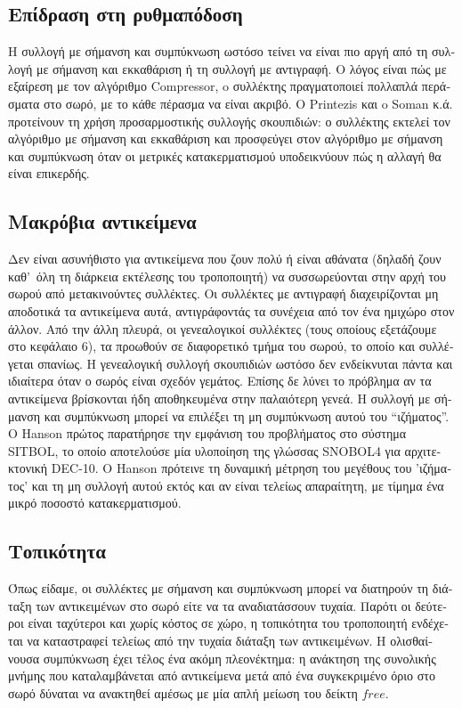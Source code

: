 \begin{greek}
\subsection{Επίδραση στη ρυθμαπόδοση}
Η συλλογή με σήμανση και συμπύκνωση ωστόσο τείνει να είναι πιο αργή από τη 
συλλογή με σήμανση και εκκαθάριση ή τη συλλογή με αντιγραφή. Ο λόγος είναι πώς 
με εξαίρεση με τον αλγόριθμο Compressor, o συλλέκτης πραγματοποιεί πολλαπλά 
περάσματα στο σωρό, με το κάθε πέρασμα να είναι ακριβό. Ο Printezis \cite{DBLP:conf/jvm/Printezis01}
και o Soman κ.ά. \cite{DBLP:conf/iwmm/SomanKB04} προτείνουν τη χρήση
προσαρμοστικής συλλογής σκουπιδιών: ο συλλέκτης εκτελεί τον αλγόριθμο
με σήμανση και εκκαθάριση και προσφεύγει στον αλγόριθμο με σήμανση και συμπύκνωση
όταν οι μετρικές κατακερματισμού υποδεικνύουν πώς η αλλαγή θα είναι επικερδής.

\subsection{Μακρόβια αντικείμενα}
Δεν είναι ασυνήθιστο για αντικείμενα που ζουν πολύ ή είναι αθάνατα (δηλαδή ζουν
καθ'~όλη τη διάρκεια εκτέλεσης του τροποποιητή) να συσσωρεύονται στην αρχή του
σωρού από μετακινούντες συλλέκτες. Οι συλλέκτες με αντιγραφή διαχειρίζονται μη
αποδοτικά τα αντικείμενα αυτά, αντιγράφοντάς τα συνέχεια από τον ένα ημιχώρο
στον άλλον. Από την άλλη πλευρά, οι γενεαλογικοί συλλέκτες (τους οποίους
εξετάζουμε στο κεφάλαιο 6), τα προωθούν σε διαφορετικό τμήμα του σωρού, το
οποίο και συλλέγεται σπανίως. Η γενεαλογική συλλογή σκουπιδιών ωστόσο δεν
ενδείκνυται πάντα και ιδιαίτερα όταν ο σωρός είναι σχεδόν γεμάτος. Επίσης δε
λύνει το πρόβλημα αν τα αντικείμενα βρίσκονται ήδη αποθηκευμένα στην παλαιότερη
γενεά. Η συλλογή με σήμανση και συμπύκνωση μπορεί να επιλέξει τη μη συμπύκνωση
αυτού του ``ιζήματος''. O Hanson \cite{DBLP:journals/spe/Hanson77} πρώτος
παρατήρησε την εμφάνιση του προβλήματος στο σύστημα SITBOL, το οποίο αποτελούσε
μία υλοποίηση της γλώσσας SNOBOL4 για αρχιτεκτονική DEC-10. O Hanson πρότεινε
τη δυναμική μέτρηση του μεγέθους του 'ιζήματος' και τη μη συλλογή αυτού εκτός
και αν είναι τελείως απαραίτητη, με τίμημα ένα μικρό ποσοστό κατακερματισμού.

\subsection{Τοπικότητα}
Όπως είδαμε, οι συλλέκτες με σήμανση και συμπύκνωση μπορεί να διατηρούν τη
διάταξη των αντικειμένων στο σωρό είτε να τα αναδιατάσσουν τυχαία. Παρότι
οι δεύτεροι είναι ταχύτεροι και χωρίς κόστος σε χώρο, η τοπικότητα του
τροποποιητή ενδέχεται να καταστραφεί τελείως από την τυχαία διάταξη των
αντικειμένων. Η ολισθαίνουσα συμπύκνωση έχει τέλος ένα ακόμη πλεονέκτημα:
η ανάκτηση της συνολικής μνήμης που καταλαμβάνεται από αντικείμενα μετά
από ένα συγκεκριμένο όριο στο σωρό δύναται να ανακτηθεί αμέσως με μία απλή
μείωση του δείκτη $free$.


\end{greek}
